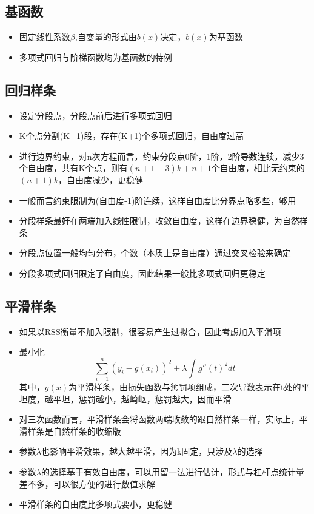 \documentclass[
]{book}
\providecommand{\tightlist}{%
  \setlength{\itemsep}{0pt}\setlength{\parskip}{0pt}}
\begin{document}
\hypertarget{ux57faux51fdux6570}{%
\subsection{基函数}\label{ux57faux51fdux6570}}

\begin{itemize}
\tightlist
\item
  固定线性系数\(\beta\),自变量的形式由\(b(x)\)决定，\(b(x)\)为基函数
\item
  多项式回归与阶梯函数均为基函数的特例
\end{itemize}

\hypertarget{ux56deux5f52ux6837ux6761}{%
\subsection{回归样条}\label{ux56deux5f52ux6837ux6761}}

\begin{itemize}
\tightlist
\item
  设定分段点，分段点前后进行多项式回归
\item
  K个点分割(K+1)段，存在(K+1)个多项式回归，自由度过高
\item
  进行边界约束，对n次方程而言，约束分段点0阶，1阶，2阶导数连续，减少3个自由度，共有K个点，则有\((n+1-3)k + n + 1\)个自由度，相比无约束的\((n+1)k\)，自由度减少，更稳健
\item
  一般而言约束限制为(自由度-1)阶连续，这样自由度比分界点略多些，够用
\item
  分段样条最好在两端加入线性限制，收敛自由度，这样在边界稳健，为自然样条
\item
  分段点位置一般均匀分布，个数（本质上是自由度）通过交叉检验来确定
\item
  分段多项式回归限定了自由度，因此结果一般比多项式回归更稳定
\end{itemize}

\hypertarget{ux5e73ux6ed1ux6837ux6761}{%
\subsection{平滑样条}\label{ux5e73ux6ed1ux6837ux6761}}

\begin{itemize}
\tightlist
\item
  如果以RSS衡量不加入限制，很容易产生过拟合，因此考虑加入平滑项
\item
  最小化 \[ \sum_{i = 1}^n (y_{i} - g(x_i))^2 + \lambda \int g''(t)^2 dt \] 其中，\(g(x)\)为平滑样条，由损失函数与惩罚项组成，二次导数表示在t处的平坦度，越平坦，惩罚越小，越崎岖，惩罚越大，因而平滑
\item
  对三次函数而言，平滑样条会将函数两端收敛的跟自然样条一样，实际上，平滑样条是自然样条的收缩版
\item
  参数\(\lambda\)也影响平滑效果，越大越平滑，因为k固定，只涉及\(\lambda\)的选择
\item
  参数\(\lambda\)的选择基于有效自由度，可以用留一法进行估计，形式与杠杆点统计量差不多，可以很方便的进行数值求解
\item
  平滑样条的自由度比多项式要小，更稳健
\end{itemize}
\end{document}
